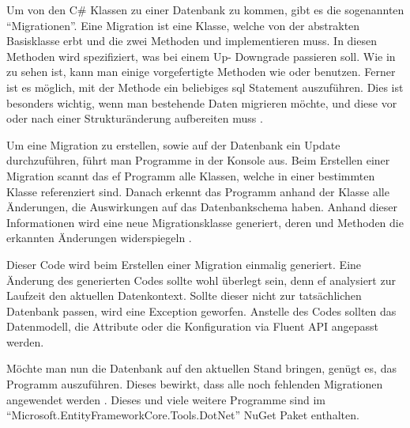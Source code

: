 


Um von den C\# Klassen zu einer Datenbank zu kommen, gibt es die sogenannten \enquote{Migrationen}. Eine Migration ist eine Klasse, welche von der abstrakten Basisklasse  erbt und die zwei Methoden  und  implementieren muss. In diesen Methoden wird spezifiziert, was bei einem Up- \bzw Downgrade passieren soll. Wie in  zu sehen ist, kann man einige vorgefertigte Methoden wie  oder  benutzen. Ferner ist es möglich, mit der  Methode ein beliebiges \gls{sql} Statement auszuführen. Dies ist besonders wichtig, wenn man bestehende Daten migrieren möchte, und diese vor oder nach einer Strukturänderung aufbereiten muss \cite{efMigrations}.


Um eine Migration zu erstellen, sowie auf der Datenbank ein Update durchzuführen, führt man Programme in der Konsole aus. Beim Erstellen einer Migration scannt das \gls{ef} Programm alle Klassen, welche in einer bestimmten  Klasse referenziert sind. Danach erkennt das Programm anhand der  Klasse alle Änderungen, die Auswirkungen auf das Datenbankschema haben. Anhand dieser Informationen wird eine neue Migrationsklasse generiert, deren  und  Methoden die erkannten Änderungen widerspiegeln \cite{efMigrations}.

Dieser Code wird beim Erstellen einer Migration einmalig generiert. Eine Änderung des generierten Codes sollte wohl überlegt sein, denn \gls{ef} analysiert zur Laufzeit den aktuellen Datenkontext. Sollte dieser nicht zur tatsächlichen Datenbank passen, wird eine Exception geworfen. Anstelle des Codes sollten das Datenmodell, die Attribute oder die Konfiguration via Fluent API angepasst werden.

Möchte man nun die Datenbank auf den aktuellen Stand bringen, genügt es, das  Programm auszuführen. Dieses bewirkt, dass alle noch fehlenden Migrationen angewendet werden \cite{efMigrations}. Dieses und viele weitere Programme sind im \enquote{Microsoft.EntityFrameworkCore.Tools.DotNet} NuGet Paket enthalten.
